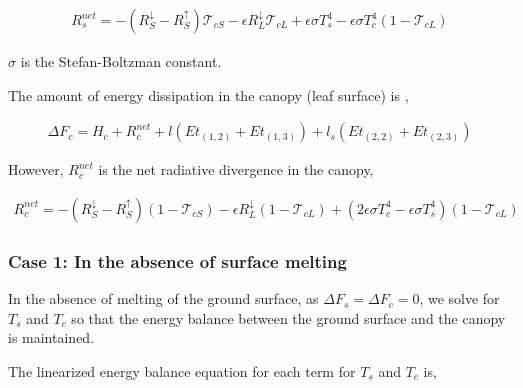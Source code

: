 \begin{eqnarray}
  R^{net}_s = -(R^{\downarrow}_S - R^{\uparrow}_S) {\mathcal{T}}_{cS}
              - \epsilon R^{\downarrow}_L {\mathcal{T}}_{cL}
              + \epsilon \sigma T_s^4
              - \epsilon \sigma T_c^4 (1 - {\mathcal{T}}_{cL})
\end{eqnarray}

\(\sigma\) is the Stefan-Boltzman constant.

The amount of energy dissipation in the canopy (leaf surface) is ,

\begin{eqnarray}
  \Delta F_c =
  H_c + R^{net}_c + l ( Et_{(1,2)} + Et_{(1,3)} )
  + l_s ( Et_{(2,2)} + Et_{(2,3)} )
\end{eqnarray}

However, \(R^{net}_c\) is the net radiative divergence in the canopy,

\begin{eqnarray}
  R^{net}_c = -(R^{\downarrow}_S - R^{\uparrow}_S) (1-{\mathcal{T}}_{cS})
              - \epsilon R^{\downarrow}_L (1-{\mathcal{T}}_{cL})
              + ( 2 \epsilon \sigma T_c^4
              - \epsilon \sigma T_s^4 ) (1 - {\mathcal{T}}_{cL})
\end{eqnarray}

\hypertarget{case-1-in-the-absence-of-surface-melting}{%
\subsubsection{Case 1: In the absence of surface
melting}\label{case-1-in-the-absence-of-surface-melting}}

In the absence of melting of the ground surface, as
\(\Delta F_s=\Delta F_c=0\), we solve for \(T_s\) and \(T_c\) so that
the energy balance between the ground surface and the canopy is
maintained.

The linearized energy balance equation for each term for \(T_s\) and
\(T_c\) is,


